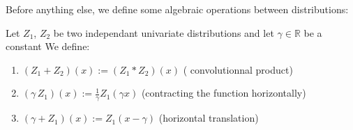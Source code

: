 \documentclass{article}
\begin{document}
Before anything else, we define some algebraic operations between distributions:
\begin{defn}
\label{def:algebraic operations on distributions}
Let $Z_1$, $Z_2$ be two independant univariate distributions and let $\gamma \in \mathbb{R}$ be a constant 
We define:
\begin{enumerate}
    \item $(Z_1+Z_2)(x) := (Z_1 * Z_2)(x)$    ( convolutionnal product)
    \item $(\gamma \, Z_1)(x) := \frac{1}{\gamma}Z_1(\gamma x) $      (contracting the function horizontally)
    \item $(\gamma + Z_1)(x) := Z_1(x - \gamma)$     (horizontal translation)
\end{enumerate}
\end{defn}
\end{document}
